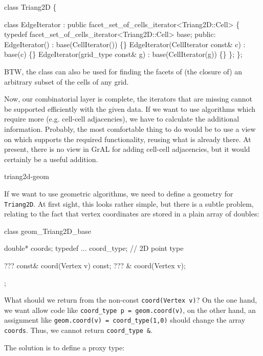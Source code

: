 \begin{example}
class Triang2D \{

   class EdgeIterator 
    : public facet_set_of_cells_iterator<Triang2D::Cell>
   \{
     typedef facet_set_of_cells_iterator<Triang2D::Cell> base;
    public: 
     EdgeIterator() : base(CellIterator()) \{\}
     EdgeIterator(CellIterator  const& c) : base(c) \{\}
     EdgeIterator(grid_type const& g)  : base(CellIterator(g)) \{\}
  \};
\};
\end{example}
BTW, the class 
can also be used for finding the facets of (the closure of)
an arbitrary subset of the cells of any grid.


Now, our combinatorial layer is complete, 
the iterators that are missing cannot be supported efficiently
with the given data.
If we want to use algorithms which require more (e.g. cell-cell 
adjacencies), we have to calculate the additional information.
Probably, the most comfortable thing to do would be
to use a view on  which supports the 
required functionality, reusing what is already there.
At present, there is no view in GrAL 
for adding cell-cell adjacencies, but it would certainly be 
a useful addition.

\begin{Label}{triang2d-geom}
\end{Label}


If we want to use geometric algorithms,
we need to define a geometry for \texttt{Triang2D}.
At first sight, this looks rather simple,
but there is a subtle problem, 
relating to the fact that vertex coordinates are stored 
in a plain array of doubles:

\begin{example}
class geom_Triang2D_base {
   double* coords;
   typedef ... coord_type;  // 2D point type

   ??? const& coord(Vertex v) const;
   ???      & coord(Vertex v);
};
\end{example}

What should we return from 
the non-const \texttt{coord(Vertex v)}?
On the one hand, we want allow code like
\texttt{coord\_type p = geom.coord(v)},
on the other hand, an assignment like
\texttt{geom.coord(v) = coord\_type(1,0)} should change the
array \texttt{coords}.
Thus, we cannot return \texttt{coord\_type \&}.

The solution is to define a proxy type:

